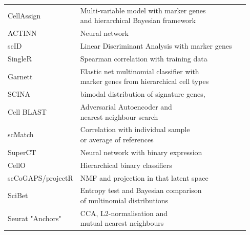 \begin{table}[p]
\begin{tabular}{l|l|c}
CellAssign & \specialcell[t]{Multi-variable model with marker genes 
\\and hierarchical Bayesian framework} & ~\citep{zhang_probabilistic_2019}\\

ACTINN & Neural network & ~\citep{ma_automated_2019}\\

scID & Linear Discriminant Analysis with marker genes & ~\citep{boufea_scid:_2019}\\

SingleR & Spearman correlation with training data & ~\citep{aran_reference-based_2019}\\

Garnett & \specialcell[t]{Elastic net multinomial classifier with\\marker genes from hierarchical cell types} & ~\citep{pliner_supervised_2019}\\

SCINA & bimodal distribution of signature genes, & ~\citep{zhang_scina:_2019}\\

Cell BLAST & \specialcell[t]{Adversarial Autoencoder and\\nearest neighbour search} & ~\citep{cao_cell_2019}\\

scMatch & \specialcell[t]{Correlation with individual sample\\or average of references} & ~\citep{hou_scmatch:_2019}\\

SuperCT & Neural network with binary expression & ~\citep{xie_superct:_2019}\\

CellO & Hierarchical binary classifiers & ~\citep{bernstein_hierarchical_2019}\\

scCoGAPS/projectR & NMF and projection in that latent space & ~\citep{stein-obrien_decomposing_2019}\\

SciBet & \specialcell[t]{Entropy test and Bayesian comparison\\of multinomial distributions} & ~\citep{li_scibet:_2019}\\

Seurat "Anchors" & \specialcell[t]{CCA, L2-normalisation and\\mutual nearest neighbours} & ~\citep{stuart_comprehensive_2019}\\


\end{tabular}
\end{table}
